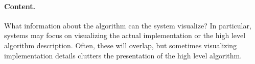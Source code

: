 \paragraph{Content.} What information about the algorithm can the system
visualize? In particular, systems may focus on visualizing the actual
implementation or the high level algorithm description. Often, these will
overlap, but sometimes visualizing implementation details clutters the
presentation of the high level algorithm.

